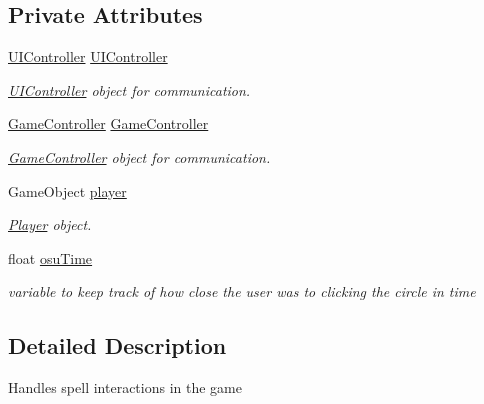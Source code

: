 \subsection*{Private Attributes}
\begin{DoxyCompactItemize}
\item 
\mbox{\label{class_spell_controller_a01fd503ede5facdd5e8dd6ed02dca4ba}} 
\hyperlink{class_u_i_controller}{U\+I\+Controller} \hyperlink{class_spell_controller_a01fd503ede5facdd5e8dd6ed02dca4ba}{U\+I\+Controller}
\begin{DoxyCompactList}\small\item\em \hyperlink{class_u_i_controller}{U\+I\+Controller} object for communication. \end{DoxyCompactList}\item 
\mbox{\label{class_spell_controller_aebf669b2371dc1e055144a731ad56a84}} 
\hyperlink{class_game_controller}{Game\+Controller} \hyperlink{class_spell_controller_aebf669b2371dc1e055144a731ad56a84}{Game\+Controller}
\begin{DoxyCompactList}\small\item\em \hyperlink{class_game_controller}{Game\+Controller} object for communication. \end{DoxyCompactList}\item 
\mbox{\label{class_spell_controller_a29b551a129180a586d25625380f6eb39}} 
Game\+Object \hyperlink{class_spell_controller_a29b551a129180a586d25625380f6eb39}{player}
\begin{DoxyCompactList}\small\item\em \hyperlink{class_player}{Player} object. \end{DoxyCompactList}\item 
\mbox{\label{class_spell_controller_a7448d6b3424043cb1b182e82d0008a6d}} 
float \hyperlink{class_spell_controller_a7448d6b3424043cb1b182e82d0008a6d}{osu\+Time}
\begin{DoxyCompactList}\small\item\em variable to keep track of how close the user was to clicking the circle in time \end{DoxyCompactList}\end{DoxyCompactItemize}


\subsection{Detailed Description}
Handles spell interactions in the game 

